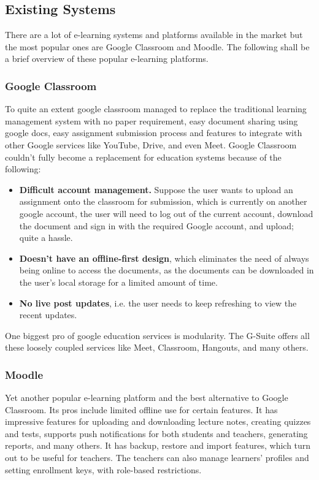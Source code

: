 \subsection{Existing Systems}

There are a lot of e-learning systems and platforms available in the market 
but the most popular ones are Google Classroom and Moodle. 
The following shall be a brief overview of these popular e-learning platforms.

\subsubsection{Google Classroom}
To quite an extent google classroom managed to replace the traditional 
learning management system with no paper requirement, easy document sharing using google docs, 
easy assignment submission process and features to integrate with other Google services 
like YouTube, Drive, and even Meet. 
Google Classroom couldn't fully become a replacement for education systems because of the following:

\begin{itemize}
    \item \textbf{Difficult account management.} Suppose the user wants to upload an assignment onto the classroom for submission, 
    which is currently on another google account, the user will need to log out of the current account, 
    download the document and sign in with the required Google account, and upload; quite a hassle.
    \item \textbf{Doesn’t have an offline-first design}, which eliminates the need of always being online to access the documents, 
    as the documents can be downloaded in the user’s local storage for a limited amount of time.
    \item \textbf{No live post updates}, i.e. the user needs to keep refreshing to view the recent updates.
\end{itemize}

One biggest pro of google education services is modularity. The G-Suite offers all these 
loosely coupled services like Meet, Classroom, Hangouts, and many others.

\subsubsection{Moodle}
Yet another popular e-learning platform and the best alternative to Google Classroom. 
Its pros include limited offline use for certain features. It has impressive features for uploading and downloading lecture notes, creating quizzes and tests, supports push notifications for both students and teachers, generating reports, and many others. 
It has backup, restore and import features, which turn out to be useful for teachers. 
The teachers can also manage learners' profiles and setting enrollment keys, with role-based restrictions.


